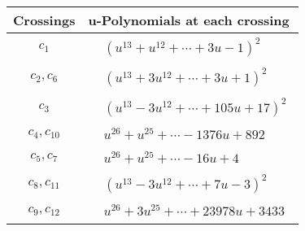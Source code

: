 \documentclass[1p]{elsarticle_modified}
\theoremstyle{definition}
\begin{document}
\begin{tabular}{m{50pt}|m{274pt}}
Crossings & \hspace{64pt}u-Polynomials at each crossing \\
\hline $$\begin{aligned}c_{1}\end{aligned}$$&$\begin{aligned}
&(u^{13}+u^{12}+\cdots+3 u-1)^{2}
\end{aligned}$\\
\hline $$\begin{aligned}c_{2},c_{6}\end{aligned}$$&$\begin{aligned}
&(u^{13}+3 u^{12}+\cdots+3 u+1)^{2}
\end{aligned}$\\
\hline $$\begin{aligned}c_{3}\end{aligned}$$&$\begin{aligned}
&(u^{13}-3 u^{12}+\cdots+105 u+17)^{2}
\end{aligned}$\\
\hline $$\begin{aligned}c_{4},c_{10}\end{aligned}$$&$\begin{aligned}
&u^{26}+u^{25}+\cdots-1376 u+892
\end{aligned}$\\
\hline $$\begin{aligned}c_{5},c_{7}\end{aligned}$$&$\begin{aligned}
&u^{26}+u^{25}+\cdots-16 u+4
\end{aligned}$\\
\hline $$\begin{aligned}c_{8},c_{11}\end{aligned}$$&$\begin{aligned}
&(u^{13}-3 u^{12}+\cdots+7 u-3)^{2}
\end{aligned}$\\
\hline $$\begin{aligned}c_{9},c_{12}\end{aligned}$$&$\begin{aligned}
&u^{26}+3 u^{25}+\cdots+23978 u+3433
\end{aligned}$\\
\hline
\end{tabular}\\~\\
\newpage\renewcommand{\arraystretch}{1}
\end{document}
